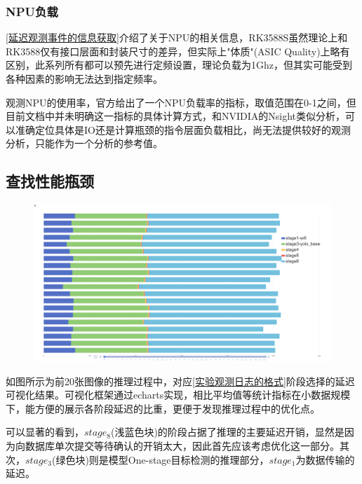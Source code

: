 \documentclass[master]{shtthesis}
\begin{document}
\subsubsection{NPU负载}
\ref{延迟观测事件的信息获取}介绍了关于NPU的相关信息，RK3588S虽然理论上和RK3588仅有接口层面和封装尺寸的差异，但实际上"体质"(ASIC Quality)上略有区别，此系列所有都可以预先进行定频设置，理论负载为1Ghz，但其实可能受到各种因素的影响无法达到指定频率。

观测NPU的使用率，官方给出了一个NPU负载率的指标，取值范围在0-1之间，但目前文档中并未明确这一指标的具体计算方式，和NVIDIA的Nsight类似分析，可以准确定位具体是IO还是计算瓶颈的指令层面负载相比，尚无法提供较好的观测分析，只能作为一个分析的参考值。

\subsection{查找性能瓶颈}
\begin{figure}[H]
	\centering
	\includegraphics[width=15cm]{img/echarts.png}
	\label{延迟阶段选择结果可视化}
\end{figure}

如图所示为前20张图像的推理过程中，对应\ref{实验观测日志的格式}阶段选择的延迟可视化结果。可视化框架通过echarts实现，相比平均值等统计指标在小数据规模下，能方便的展示各阶段延迟的比重，更便于发现推理过程中的优化点。

可以显著的看到，$stage_8$(浅蓝色块)的阶段占据了推理的主要延迟开销，显然是因为向数据库单次提交等待确认的开销太大，因此首先应该考虑优化这一部分。其次，$stage_3$(绿色块)则是模型One-stage目标检测的推理部分，$stage_1$为数据传输的延迟。
\end{document}
